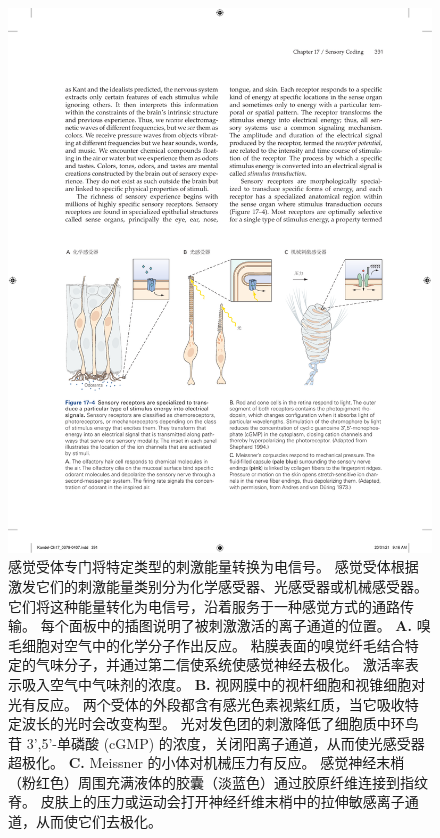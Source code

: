 \begin{figure}[htbp]
	\centering
	\includegraphics[width=1.0\linewidth]{chap17/fig_17_4}
	\caption{感觉受体专门将特定类型的刺激能量转换为电信号。 
		感觉受体根据激发它们的刺激能量类别分为化学感受器、光感受器或机械感受器。
		它们将这种能量转化为电信号，沿着服务于一种感觉方式的通路传输。
		每个面板中的插图说明了被刺激激活的离子通道的位置。
		\textbf{A.} 嗅毛细胞对空气中的化学分子作出反应。
		粘膜表面的嗅觉纤毛结合特定的气味分子，并通过第二信使系统使感觉神经去极化。
		激活率表示吸入空气中气味剂的浓度。
		\textbf{B.} 视网膜中的视杆细胞和视锥细胞对光有反应。
		两个受体的外段都含有感光色素视紫红质，当它吸收特定波长的光时会改变构型。
		光对发色团的刺激降低了细胞质中环鸟苷 3',5'-单磷酸 (cGMP) 的浓度，关闭阳离子通道，从而使光感受器超极化\cite{shepherd1988neurobiology}。
		\textbf{C.} Meissner 的小体对机械压力有反应。 
		感觉神经末梢（粉红色）周围充满液体的胶囊（淡蓝色）通过胶原纤维连接到指纹脊。
		皮肤上的压力或运动会打开神经纤维末梢中的拉伸敏感离子通道，从而使它们去极化\cite{albe1973morphology}。}
	\label{fig:17_4}
\end{figure}


